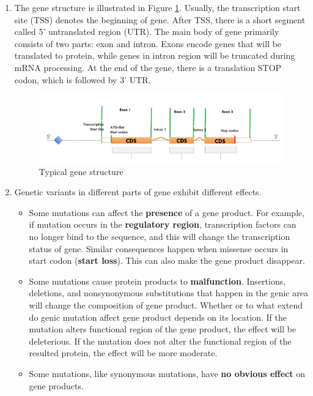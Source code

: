 \documentclass{article}
\begin{document}
\begin{enumerate}
    \item[1.2] The gene structure is illustrated in Figure \ref{genefig}. Usually, the transcription start site (TSS) denotes the beginning of gene. After TSS, there is a short segment called 5' untranslated region (UTR). The main body of gene primarily consists of two parts: exon and intron. Exons encode genes that will be translated to protein, while genes in intron region will be truncated during mRNA processing. At the end of the gene, there is a translation STOP codon, which is followed by 3' UTR. 
    \begin{figure}[h]
        \centering
        \includegraphics[scale=0.3]{A1-Image/Structure.png}
        \caption{Typical gene structure}
        \label{genefig}
    \end{figure}
    \item[ ] Genetic variants in different parts of gene exhibit different effects.
    \begin{itemize}
        \item Some mutations can affect the \textbf{presence} of a gene product. For example, if mutation occurs in the \textbf{regulatory region}, transcription factors can no longer bind to the sequence, and this will change the transcription status of gene. Similar consequences happen when missense occurs in start codon (\textbf{start loss}). This can also make the gene product disappear.
        \item Some mutations cause protein products to \textbf{malfunction}. Insertions, deletions, and nonsynonymous substitutions that happen in the genic area will change the composition of gene product. Whether or to what extend do genic mutation affect gene product depends on its location. If the mutation alters functional region of the gene product, the effect will be deleterious. If the mutation does not alter the functional region of the resulted protein, the effect will be more moderate.
        \item Some mutations, like synonymous mutations, have \textbf{no obvious effect} on gene products.
    \end{itemize}
\end{enumerate}
    
\end{document}
